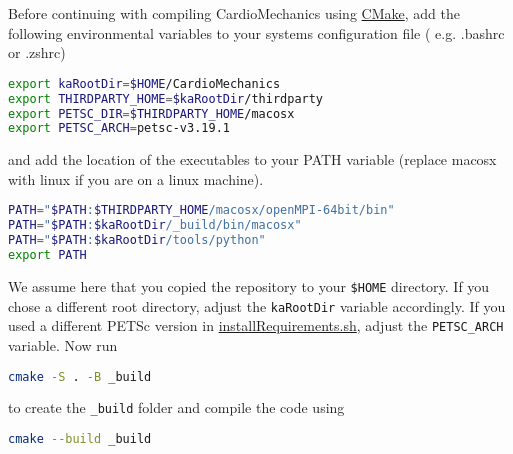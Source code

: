 Before continuing with compiling CardioMechanics using \href{https://cmake.org}{CMake}, add the following environmental variables to your systems configuration file ( e.g. .bashrc or .zshrc)
\begin{lstlisting}[language=bash]
export kaRootDir=$HOME/CardioMechanics
export THIRDPARTY_HOME=$kaRootDir/thirdparty
export PETSC_DIR=$THIRDPARTY_HOME/macosx
export PETSC_ARCH=petsc-v3.19.1
\end{lstlisting}
and add the location of the executables to your PATH variable (replace macosx with linux if you are on a linux machine).
\begin{lstlisting}[language=bash]
PATH="$PATH:$THIRDPARTY_HOME/macosx/openMPI-64bit/bin"
PATH="$PATH:$kaRootDir/_build/bin/macosx"
PATH="$PATH:$kaRootDir/tools/python"
export PATH
\end{lstlisting}
We assume here that you copied the repository to your \verb|$HOME| directory.
If you chose a different root directory, adjust the \verb|kaRootDir| variable accordingly.
If you used a different PETSc version in \href{https://github.com/KIT-IBT/CardioMechanics/blob/main/installRequirements.sh}{installRequirements.sh}, adjust the \verb|PETSC_ARCH| variable.
Now run 
\begin{lstlisting}[language=bash]
cmake -S . -B _build
\end{lstlisting}
to create the \verb|_build| folder and compile the code using
\begin{lstlisting}[language=bash]
cmake --build _build
\end{lstlisting}
